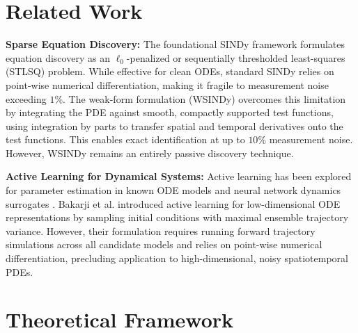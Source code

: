 \documentclass[twocolumn,10pt,a4paper]{article}
\begin{document}
\section{Related Work}
\textbf{Sparse Equation Discovery:} The foundational SINDy framework \cite{brunton2016discovering} formulates equation discovery as an $\ell_0$-penalized or sequentially thresholded least-squares (STLSQ) problem. While effective for clean ODEs, standard SINDy relies on point-wise numerical differentiation, making it fragile to measurement noise exceeding $1\%$. The weak-form formulation (WSINDy) \cite{schaeffer2017learning, messenger2021weak} overcomes this limitation by integrating the PDE against smooth, compactly supported test functions, using integration by parts to transfer spatial and temporal derivatives onto the test functions. This enables exact identification at up to $10\%$ measurement noise. However, WSINDy remains an entirely passive discovery technique.

\textbf{Active Learning for Dynamical Systems:} Active learning has been explored for parameter estimation in known ODE models \cite{chaloner1995bayesian, huan2013simulation} and neural network dynamics surrogates \cite{kaiser2018sparse, bakarji2023model}. Bakarji et al. \cite{bakarji2023model} introduced active learning for low-dimensional ODE representations by sampling initial conditions with maximal ensemble trajectory variance. However, their formulation requires running forward trajectory simulations across all candidate models and relies on point-wise numerical differentiation, precluding application to high-dimensional, noisy spatiotemporal PDEs.

\section{Theoretical Framework}
\end{document}
